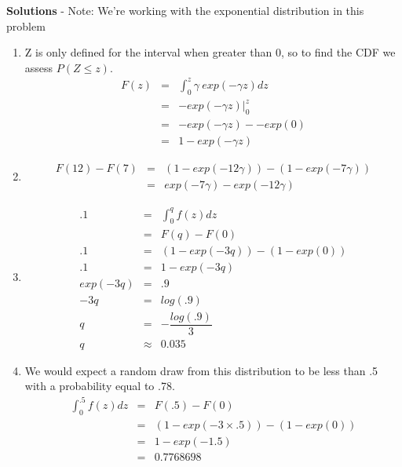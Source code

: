 \documentclass[11pt]{article}
\begin{document}
\textbf{Solutions} - Note: We're working with the exponential distribution in this problem
\begin{enumerate}

\item
	Z is only defined for the interval when greater than 0, so to find the CDF we assess $P(Z \le z)$. 
	\begin{eqnarray*}
	F(z) &=& \int_0^z \gamma \ exp(-\gamma z) dz\\
	&=& - exp(-\gamma z) |_0^{z}\\
	&=&  - exp(-\gamma z) - - exp(0)\\
	&=& 1 - exp(-\gamma z)
	\end{eqnarray*}
	
\item 
	\begin{eqnarray*}
	F(12) - F(7) &=& ( 1 - exp(-12\gamma) ) - ( 1 - exp(-7\gamma) )\\
	&=&  exp(-7\gamma) - exp(-12\gamma) 
	\end{eqnarray*}

\item
	\begin{eqnarray*}
	.1 &=& \int_0^q f(z)dz\\
	&=& F(q) - F(0)\\
	.1 &=&  ( 1 - exp(-3q) ) - ( 1 - exp(0) )\\
	.1 &=& 1 - exp(-3q)\\
	exp(-3q) &=& .9\\
	-3q &=& log(.9)\\
	q &=& - \dfrac{log(.9)}{3}\\
	q &\approx& 0.035
	\end{eqnarray*}
	
\item
	We would expect a random draw from this distribution to be less than .5 with a probability equal to .78. 
	\begin{eqnarray*}
	\int_0^{.5} f(z)dz &=& F(.5) - F(0)\\
	&=&  ( 1 - exp(-3 \times .5) ) - ( 1 - exp(0) )\\
	&=& 1 - exp(-1.5)\\
	&=& 0.7768698
	\end{eqnarray*}
\end{enumerate}
\end{document}
